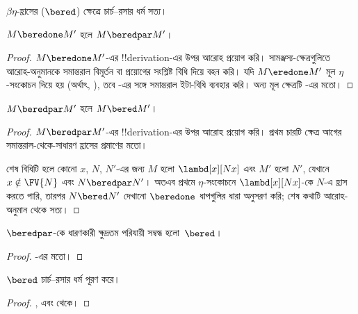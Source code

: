 \documentclass[../../../include/open-logic-section]{subfiles}
\begin{document}


$\beta\eta$-হ্রাসের ($\bered$) ক্ষেত্রে চার্চ--রসার ধর্ম সত্য।

\begin{lem}
  $M \beredone M'$ হলে $M \beredpar M'$।
\end{lem}

\begin{proof}
  $M \beredone M'$-এর !!{derivation}-এর উপর আরোহ প্রয়োগ করি।
  সামঞ্জস্য-ক্ষেত্রগুলিতে আরোহ-অনুমানকে সমান্তরাল বিমূর্তন বা প্রয়োগের
  সংশ্লিষ্ট বিধি দিয়ে বহন করি। যদি $M \eredone M'$ মূল
  $\eta$-সংকোচন দিয়ে হয় (অর্থাৎ,
  ), তবে -এর সঙ্গে
  সমান্তরাল ইটা-বিধি ব্যবহার করি। অন্য মূল ক্ষেত্রটি
  -এর মতো।
\end{proof}


\begin{lem}
  $M \beredpar M'$ হলে $M \bered M'$।
\end{lem}

\begin{proof} $M \beredpar M'$-এর !!{derivation}-এর উপর আরোহ প্রয়োগ
  করি। প্রথম চারটি ক্ষেত্র আগের সমান্তরাল-থেকে-সাধারণ হ্রাসের প্রমাণের
  মতো।

  শেষ বিধিটি  হলে কোনো $x$, $N$, $N'$-এর
  জন্য $M$ হলো $\lambd[x][Nx]$ এবং $M'$ হলো $N'$, যেখানে
  $x \notin \FV{N}$ এবং $N \beredpar N'$। অতএব প্রথমে
  $\eta$-সংকোচনে $\lambd[x][Nx]$-কে $N$-এ হ্রাস করতে পারি, তারপর
  $N \bered N'$ দেখানো $\beredone$ ধাপগুলির ধারা অনুসরণ করি; শেষ কথাটি
  আরোহ-অনুমান থেকে সত্য।
\end{proof}


\begin{lem}
  $\beredpar$-কে ধারণকারী ক্ষুদ্রতম পরিযায়ী সম্বন্ধ হলো~$\bered$।
\end{lem}

\begin{proof}
  -এর মতো।
\end{proof}

\begin{thm}
  $\bered$ চার্চ--রসার ধর্ম পূরণ করে।
\end{thm}

\begin{proof}
  ,  এবং  থেকে।
\end{proof}
\end{document}

